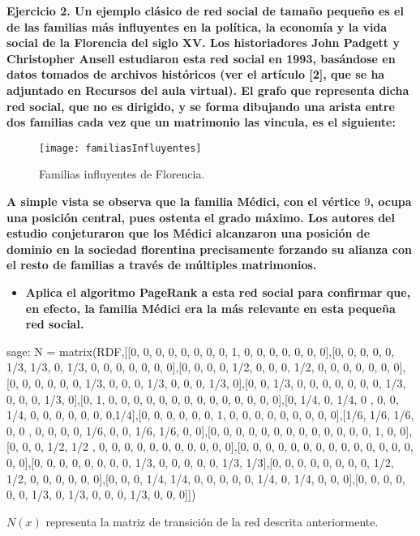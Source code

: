 \newpage
\begin{ejer}
    \textbf{Ejercicio 2. Un ejemplo clásico de red social de tamaño pequeño es el de las familias 
    más influyentes en la política, la economía y la vida social de la Florencia del siglo XV. 
    Los historiadores John Padgett y Christopher Ansell estudiaron esta red social en 1993, 
    basándose en datos tomados de archivos históricos (ver el artículo [2], que se ha adjuntado en 
    Recursos del aula virtual). El grafo que representa dicha red social, que no es dirigido, 
    y se forma dibujando una arista entre dos familias cada vez que un matrimonio las vincula, es el siguiente:}
\end{ejer}
 \begin{figure}[H]
	\texttt{[image: familiasInfluyentes]}
	\centering
	\caption{Familias influyentes de Florencia.}
    \label{fig:familiasInfluyentes}
\end{figure}
\begin{ejer}
    \textbf{A simple vista se observa que la familia Médici, con el vértice $9$, ocupa una posición central, pues ostenta el grado máximo. 
    Los autores del estudio conjeturaron que los Médici alcanzaron una posición de dominio en la sociedad florentina precisamente forzando 
    su alianza con el resto de familias a través de múltiples matrimonios.}
\end{ejer}
\begin{ejer}
    \begin{itemize}
        \item \textbf{Aplica el algoritmo PageRank a esta red social para confirmar que, en efecto, la familia Médici era la más relevante en esta pequeña red social.}
    \end{itemize}
\end{ejer}
\begin{sagecommandline}
    sage: N = matrix(RDF,[[0, 0, 0, 0, 0, 0, 0, 0, 1, 0, 0, 0, 0, 0, 0, 0],[0, 0, 0, 0, 0, 1/3, 1/3, 0, 1/3, 0, 0, 0, 0, 0, 0, 0],[0, 0, 0, 0, 1/2, 0, 0, 0, 1/2, 0, 0, 0, 0, 0, 0, 0],[0, 0, 0, 0, 0, 0, 1/3, 0, 0, 0, 1/3, 0, 0, 0, 1/3, 0],[0, 0, 1/3, 0, 0, 0, 0, 0, 0, 0, 1/3, 0, 0, 0, 1/3, 0],[0, 1, 0, 0, 0, 0, 0, 0, 0, 0, 0, 0, 0, 0, 0, 0],[0, 1/4, 0, 1/4, 0 , 0, 0, 1/4, 0, 0, 0, 0, 0, 0, 0,1/4],[0, 0, 0, 0, 0, 0, 1, 0, 0, 0, 0, 0, 0, 0, 0, 0],[1/6, 1/6, 1/6, 0, 0 , 0, 0, 0, 0, 1/6, 0, 0, 1/6, 1/6, 0, 0],[0, 0, 0, 0, 0, 0, 0, 0, 0, 0, 0, 0, 0, 1, 0, 0],[0, 0, 0, 1/2, 1/2 , 0, 0, 0, 0, 0, 0, 0, 0, 0, 0, 0],[0, 0, 0, 0, 0, 0, 0, 0, 0, 0, 0, 0, 0, 0, 0, 0],[0, 0, 0, 0, 0, 0, 0, 0, 1/3, 0, 0, 0, 0, 0, 1/3, 1/3],[0, 0, 0, 0, 0, 0, 0, 0, 1/2, 1/2, 0, 0, 0, 0, 0, 0],[0, 0, 0, 1/4, 1/4, 0, 0, 0, 0, 0, 1/4, 0, 1/4, 0, 0, 0],[0, 0, 0, 0, 0, 0, 1/3, 0, 1/3, 0, 0, 0, 1/3, 0, 0, 0]])
\end{sagecommandline}
\par $N(x)$ representa la matriz de transición de la red descrita anteriormente.

